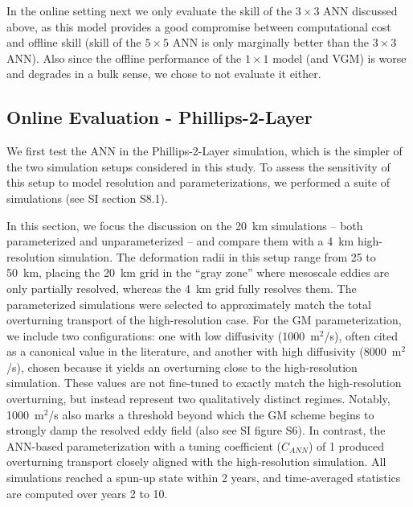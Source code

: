 \documentclass[draft]{agujournal2019}
\begin{document}
In the online setting next we only evaluate the skill of the $3\times3$ ANN discussed above, as this model provides a good compromise between computational cost and offline skill (skill of the $5\times5$ ANN is only marginally better than the $3\times3$ ANN). Also since the offline performance of the $1\times1$ model (and VGM) is worse and degrades in a bulk sense, we chose to not evaluate it either.

\subsection{Online Evaluation - Phillips-2-Layer}
We first test the ANN in the Phillips-2-Layer simulation, which is the simpler of the two simulation setups considered in this study. To assess the sensitivity of this setup to model resolution and parameterizations, we performed a suite of simulations (see SI section S8.1).

In this section, we focus the discussion on the 20~km simulations -- both parameterized and unparameterized -- and compare them with a 4~km high-resolution simulation. The deformation radii in this setup range from 25 to 50~km, placing the 20~km grid in the ``gray zone'' where mesoscale eddies are only partially resolved, whereas the 4~km grid fully resolves them. The parameterized simulations were selected to approximately match the total overturning transport of the high-resolution case. For the GM parameterization, we include two configurations: one with low diffusivity (1000~m$^2$/s), often cited as a canonical value in the literature, and another with high diffusivity (8000~m$^2$/s), chosen because it yields an overturning close to the high-resolution simulation. These values are not fine-tuned to exactly match the high-resolution overturning, but instead represent two qualitatively distinct regimes. Notably, 1000~m$^2$/s also marks a threshold beyond which the GM scheme begins to strongly damp the resolved eddy field (also see SI figure S6).
In contrast, the ANN-based parameterization with a tuning coefficient ($C_{ANN}$) of 1  produced overturning transport closely aligned with the high-resolution simulation. All simulations reached a spun-up state within 2 years, and time-averaged statistics are computed over years 2 to 10.
\end{document}
